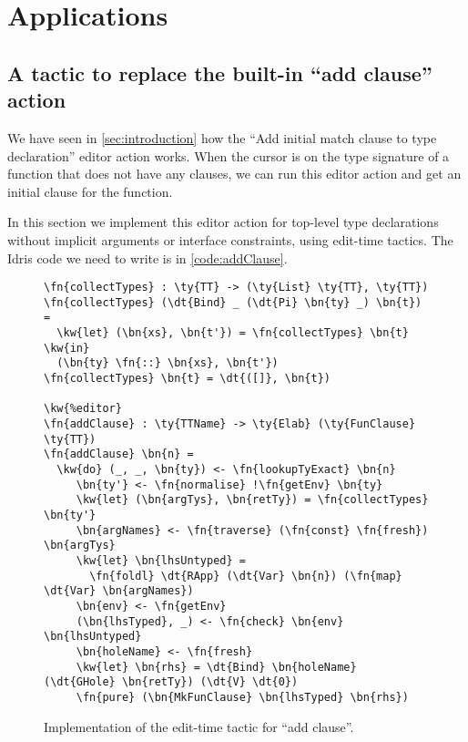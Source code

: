 \section{Applications} \label{sec:applications}

\subsection{A tactic to replace the built-in ``add clause'' action}\label{sec:addClause}

We have seen in \autoref{sec:introduction} how the ``Add initial match clause
to type declaration'' editor action works. When the cursor is on the type
signature of a function that does not have any clauses, we can run this editor
action and get an initial clause for the function.

In this section we implement this editor action for top-level type declarations
without implicit arguments or interface constraints, using edit-time tactics.
The Idris code we need to write is in \autoref{code:addClause}.

\begin{figure}[ht]
\caption{Implementation of the edit-time tactic for ``add clause''.}
\label{code:addClause}
\begin{Verbatim}[framesep=2mm, label=\footnotesize{\normalfont{Idris}}, labelposition=topline]
\fn{collectTypes} : \ty{TT} -> (\ty{List} \ty{TT}, \ty{TT})
\fn{collectTypes} (\dt{Bind} _ (\dt{Pi} \bn{ty} _) \bn{t}) =
  \kw{let} (\bn{xs}, \bn{t'}) = \fn{collectTypes} \bn{t} \kw{in}
  (\bn{ty} \fn{::} \bn{xs}, \bn{t'})
\fn{collectTypes} \bn{t} = \dt{([]}, \bn{t})

\kw{%editor}
\fn{addClause} : \ty{TTName} -> \ty{Elab} (\ty{FunClause} \ty{TT})
\fn{addClause} \bn{n} =
  \kw{do} (_, _, \bn{ty}) <- \fn{lookupTyExact} \bn{n}
     \bn{ty'} <- \fn{normalise} !\fn{getEnv} \bn{ty}
     \kw{let} (\bn{argTys}, \bn{retTy}) = \fn{collectTypes} \bn{ty'}
     \bn{argNames} <- \fn{traverse} (\fn{const} \fn{fresh}) \bn{argTys}
     \kw{let} \bn{lhsUntyped} =
       \fn{foldl} \dt{RApp} (\dt{Var} \bn{n}) (\fn{map} \dt{Var} \bn{argNames})
     \bn{env} <- \fn{getEnv}
     (\bn{lhsTyped}, _) <- \fn{check} \bn{env} \bn{lhsUntyped}
     \bn{holeName} <- \fn{fresh}
     \kw{let} \bn{rhs} = \dt{Bind} \bn{holeName} (\dt{GHole} \bn{retTy}) (\dt{V} \dt{0})
     \fn{pure} (\bn{MkFunClause} \bn{lhsTyped} \bn{rhs})
\end{Verbatim}
\end{figure}

